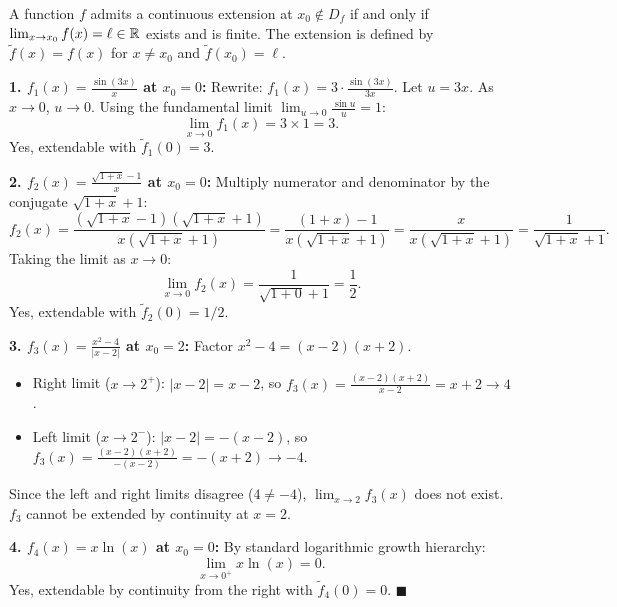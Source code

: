 \begin{solution}
A function $f$ admits a continuous extension at $x_0 \notin D_f$ if and only if $\lim_{x \to x_0} f(x) = \ell \in \mathbb{R}$ exists and is finite. The extension is defined by $\tilde{f}(x) = f(x)$ for $x \ne x_0$ and $\tilde{f}(x_0) = \ell$.

\textbf{1. $f_1(x) = \frac{\sin(3x)}{x}$ at $x_0 = 0$:}
Rewrite: $f_1(x) = 3 \cdot \frac{\sin(3x)}{3x}$.
Let $u = 3x$. As $x \to 0$, $u \to 0$. Using the fundamental limit $\lim_{u \to 0} \frac{\sin u}{u} = 1$:
\[
\lim_{x \to 0} f_1(x) = 3 \times 1 = 3.
\]
Yes, extendable with $\tilde{f}_1(0) = 3$.

\textbf{2. $f_2(x) = \frac{\sqrt{1 + x} - 1}{x}$ at $x_0 = 0$:}
Multiply numerator and denominator by the conjugate $\sqrt{1 + x} + 1$:
\[
f_2(x) = \frac{(\sqrt{1 + x} - 1)(\sqrt{1 + x} + 1)}{x(\sqrt{1 + x} + 1)} = \frac{(1 + x) - 1}{x(\sqrt{1 + x} + 1)} = \frac{x}{x(\sqrt{1 + x} + 1)} = \frac{1}{\sqrt{1 + x} + 1}.
\]
Taking the limit as $x \to 0$:
\[
\lim_{x \to 0} f_2(x) = \frac{1}{\sqrt{1 + 0} + 1} = \frac{1}{2}.
\]
Yes, extendable with $\tilde{f}_2(0) = 1/2$.

\textbf{3. $f_3(x) = \frac{x^2 - 4}{|x - 2|}$ at $x_0 = 2$:}
Factor $x^2 - 4 = (x - 2)(x + 2)$.
\begin{itemize}[leftmargin=1.5em,itemsep=1pt]
  \item Right limit ($x \to 2^+$): $|x - 2| = x - 2$, so $f_3(x) = \frac{(x-2)(x+2)}{x-2} = x + 2 \to 4$.
  \item Left limit ($x \to 2^-$): $|x - 2| = -(x - 2)$, so $f_3(x) = \frac{(x-2)(x+2)}{-(x-2)} = -(x + 2) \to -4$.
\end{itemize}
Since the left and right limits disagree ($4 \ne -4$), $\lim_{x \to 2} f_3(x)$ does not exist.
$f_3$ cannot be extended by continuity at $x = 2$.

\textbf{4. $f_4(x) = x \ln(x)$ at $x_0 = 0$:}
By standard logarithmic growth hierarchy:
\[
\lim_{x \to 0^+} x \ln(x) = 0.
\]
Yes, extendable by continuity from the right with $\tilde{f}_4(0) = 0$. \hfill $\blacksquare$
\end{solution}


